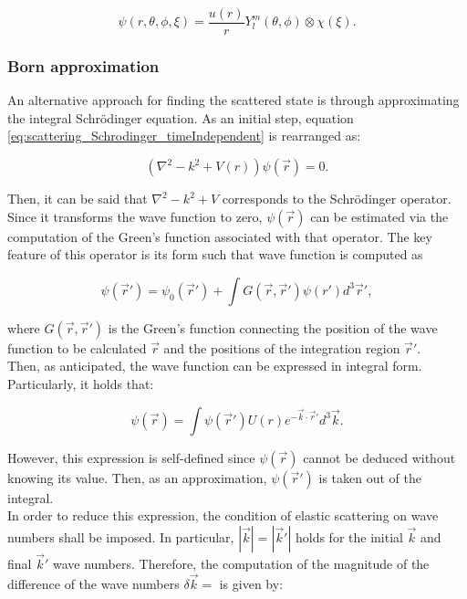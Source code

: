 \documentclass[openany]{book}
\begin{document}
\begin{equation} \label{eq:scattering_waveFunction}
	\psi(r, \theta, \phi, \xi) = \frac{u(r)}{r} Y_{l}^{m}(\theta, \phi) \otimes \chi(\xi).
\end{equation}

\subsubsection{Born approximation}

An alternative approach for finding the scattered state is through approximating the integral Schrödinger equation. As an initial step, equation \ref{eq:scattering_Schrodinger_timeIndependent} is rearranged as:

\begin{equation} \label{eq:bornApproximation_operator}
 	(\nabla^2  - k^2 + V(r))\psi(\vec r) = 0.
\end{equation}

Then, it can be said that $\nabla^2  - k^2 + V$ corresponds to the Schrödinger operator. Since it transforms the wave function to zero,  $\psi(\vec r)$ can be estimated via the computation of the Green's function associated with that operator. The key feature of this operator is its form such that wave function is computed as 

\begin{equation} \label{eq:bornApproximation_greenFunction}
		\psi(\vec r') = \psi_0(\vec r') + \int {G(\vec r, \vec r') \psi(r') d^3\vec r'},
\end{equation}

where $G(\vec r, \vec r')$ is the Green's function connecting the position of the wave function to be calculated $\vec r$ and the positions of the integration region  $\vec r'$. \\

Then, as anticipated, the wave function can be expressed in integral form. Particularly, it holds that:

 \begin{equation} \label{eq:bornApproximation_equation}
 	\psi(\vec r) = \int{ \psi(\vec r' )U(r)e^{-\vec k \cdot \vec r'} d^3 \vec k}. 
 \end{equation}

However, this expression is self-defined since $\psi(\vec r) $ cannot be deduced without knowing its value. Then, as an approximation, $\psi(\vec r') $ is taken out of the integral.  \\

In order to reduce this expression, the condition of elastic scattering on wave numbers shall be imposed. In particular, $|\vec k| = |\vec k'| $ holds for the initial $\vec k$ and final $\vec k'$ wave numbers. Therefore, the computation of the magnitude of the difference of the wave numbers $\delta \vec k = $ is given by: 
\end{document}

